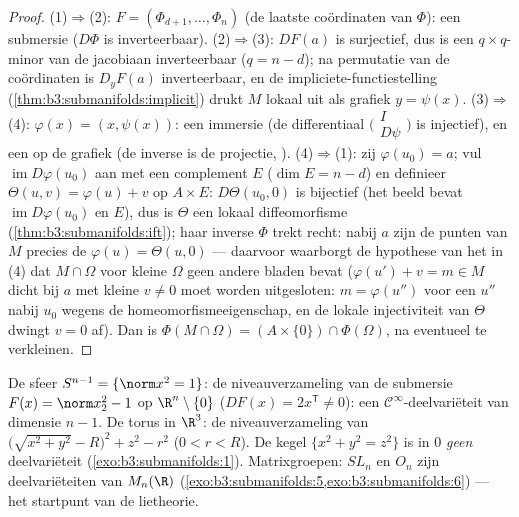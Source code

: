 \begin{proof}
(1)$\Rightarrow$(2): $F = (\Phi_{d+1}, \dots, \Phi_n)$ (de
laatste coördinaten van $\Phi$): een submersie ($D\Phi$ is
inverteerbaar).
(2)$\Rightarrow$(3): $DF(a)$ is surjectief, dus is een
$q\times q$-minor van de jacobiaan inverteerbaar ($q = n - d$);
na permutatie van de coördinaten is $D_yF(a)$ inverteerbaar, en
de impliciete-functiestelling
(\cref{thm:b3:submanifolds:implicit}) drukt $M$ lokaal uit als
grafiek $y = \psi(x)$.
(3)$\Rightarrow$(4): $\varphi(x) = (x, \psi(x))$: een immersie
(de differentiaal $\bigl(\begin{smallmatrix}I\\
D\psi\end{smallmatrix}\bigr)$ is injectief), en een
 op de grafiek (de inverse is de projectie,
).
(4)$\Rightarrow$(1): zij $\varphi(u_0) = a$; vul
$\operatorname{im}D\varphi(u_0)$ aan met een complement $E$
($\dim E = n - d$) en definieer $\Theta(u, v) = \varphi(u) + v$
op $A\times E$: $D\Theta(u_0, 0)$ is bijectief (het beeld bevat
$\operatorname{im}D\varphi(u_0)$ en $E$), dus is $\Theta$ een
lokaal diffeomorfisme (\cref{thm:b3:submanifolds:ift}); haar
inverse $\Phi$ trekt recht: nabij $a$ zijn de punten van $M$
precies de $\varphi(u) = \Theta(u, 0)$ --- daarvoor waarborgt de
hypothese van het  in (4) dat $M\cap\Omega$ voor
kleine $\Omega$ geen andere bladen bevat ($\varphi(u') + v = m
\in M$ dicht bij $a$ met kleine $v \neq 0$ moet worden
uitgesloten: $m = \varphi(u'')$ voor een $u''$ nabij $u_0$ wegens
de homeomorfismeeigenschap, en de lokale injectiviteit van
$\Theta$ dwingt $v = 0$ af). Dan is $\Phi(M\cap\Omega) =
(A\times\{0\})\cap\Phi(\Omega)$, na eventueel te verkleinen.
\end{proof}

\begin{example}\label{ex:b3:submanifolds:examples}
De sfeer $S^{n-1} = \{\norm x^2 = 1\}$: de niveauverzameling van
de submersie $F(x) = \norm x_2^2 - 1$ op $\R^n\setminus\{0\}$
($DF(x) = 2x^{\mathsf T} \ne 0$): een $\mathcal
C^\infty$-deelvariëteit van dimensie $n - 1$. De torus in $\R^3$:
de niveauverzameling van $\bigl(\sqrt{x^2 + y^2} - R\bigr)^2 +
z^2 - r^2$ ($0 < r < R$). De kegel $\{x^2 + y^2 = z^2\}$ is in
$0$ \emph{geen} deelvariëteit (\cref{exo:b3:submanifolds:1}).
Matrixgroepen: $SL_n$ en $O_n$ zijn deelvariëteiten van
$M_n(\R)$ (\cref{exo:b3:submanifolds:5,exo:b3:submanifolds:6})
--- het startpunt van de lietheorie.
\end{example}

